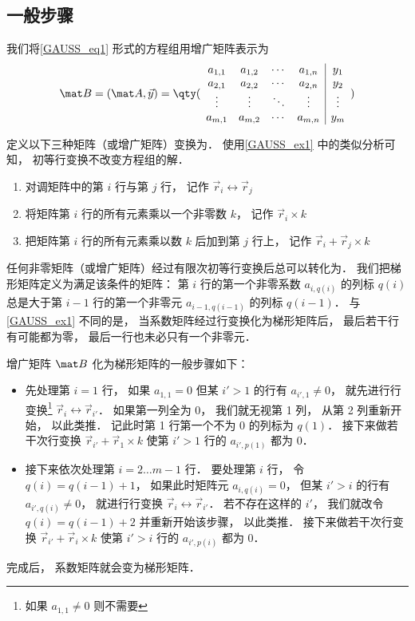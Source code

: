 \subsection{一般步骤}

我们将\autoref{GAUSS_eq1} 形式的方程组用增广矩阵表示为
\begin{equation}
\mat B=(\mat A ,\vec y)={
	\qty( \begin{array}{cccc|c}
	a_{1,1} &a_{1,2} &\cdots &a_{1,n} &y_1 \\
	a_{2,1} &a_{2,2} &\cdots &a_{2,n} &y_2 \\
	\vdots  &\vdots  &\ddots &\vdots  &\vdots \\
	a_{m,1} &a_{m,2} &\cdots &a_{m,n} &y_m \\
	\end{array} 
	)}
\end{equation}

定义以下三种矩阵（或增广矩阵）变换为． 使用\autoref{GAUSS_ex1} 中的类似分析可知， 初等行变换不改变方程组的解．
\begin{enumerate}
\item 对调矩阵中的第 $i$ 行与第 $j$ 行， 记作 $\vec r_i \leftrightarrow \vec r_j$

\item 将矩阵第 $i$ 行的所有元素乘以一个非零数 $k$， 记作 $\vec r_i \times k$

\item 把矩阵第 $i$ 行的所有元素乘以数 $k$ 后加到第 $j$ 行上， 记作 $\vec r_i + \vec r_j \times k$
\end{enumerate}

任何非零矩阵（或增广矩阵）经过有限次初等行变换后总可以转化为． 我们把梯形矩阵定义为满足该条件的矩阵： 第 $i$ 行的第一个非零系数 $a_{i,q(i)}$ 的列标 $q(i)$ 总是大于第 $i-1$ 行的第一个非零元 $a_{i-1, q(i-1)}$ 的列标 $q(i-1)$． 与\autoref{GAUSS_ex1} 不同的是， 当系数矩阵经过行变换化为梯形矩阵后， 最后若干行有可能都为零， 最后一行也未必只有一个非零元．

增广矩阵 $\mat B$ 化为梯形矩阵的一般步骤如下：
\begin{itemize}
\item 先处理第 $i = 1$ 行， 如果 $a_{1,1} = 0$ 但某 $i' > 1$ 的行有 $a_{i', 1} \ne 0$， 就先进行行变换\footnote{如果 $a_{1,1} \ne 0$ 则不需要} $\vec r_i \leftrightarrow \vec r_{i'}$． 如果第一列全为 0， 我们就无视第  1 列， 从第 2 列重新开始， 以此类推． 记此时第 1 行第一个不为 0 的列标为 $q(1)$． 接下来做若干次行变换 $\vec r_{i'} + \vec r_1 \times k$ 使第 $i' > 1$ 行的 $a_{i', p(1)}$ 都为 0．

\item 接下来依次处理第 $i = 2\dots m-1$ 行． 要处理第 $i$ 行， 令 $q(i) = q(i-1)+1$， 如果此时矩阵元 $a_{i, q(i)} = 0$， 但某 $i' > i$ 的行有 $a_{i', q(i)} \ne 0$， 就进行行变换 $\vec r_i \leftrightarrow \vec r_{i'}$． 若不存在这样的 $i'$， 我们就改令 $q(i) = q(i-1) + 2$ 并重新开始该步骤， 以此类推． 接下来做若干次行变换 $\vec r_{i'} + \vec r_i \times k$ 使第 $i' > i$ 行的 $a_{i', p(i)}$ 都为 0．
\end{itemize}
完成后， 系数矩阵就会变为梯形矩阵．

